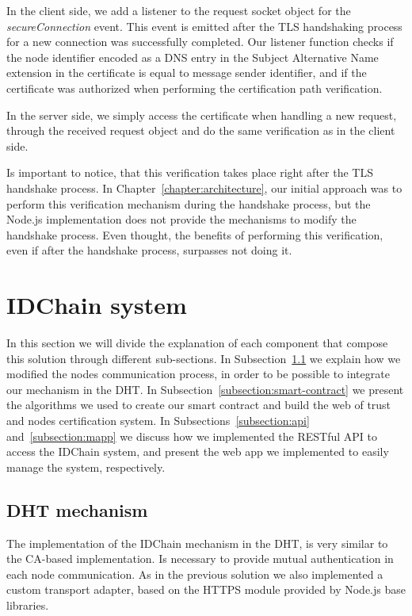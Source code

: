 In the client side, we add a listener to the request socket object for the \textit{secureConnection} event.
This event is emitted after the TLS handshaking process for a new connection was successfully completed.
Our listener function checks if the node identifier encoded as a DNS entry in the Subject Alternative Name extension in the certificate is equal to message sender identifier, and if the certificate was authorized when performing the certification path verification.


In the server side, we simply access the certificate when handling a new request, through the received request object and do the same verification as in the client side.

Is important to notice, that this verification takes place right after the TLS handshake process.
In Chapter~\ref{chapter:architecture}, our initial approach was to perform this verification mechanism during the handshake process, but the Node.js implementation does not provide the mechanisms to modify the handshake process.
Even thought, the benefits of performing this verification, even if after the handshake process, surpasses not doing it.

\section{IDChain system}\label{implementation:idchain}

In this section we will divide the explanation of each component that compose this solution through different sub-sections.
In Subsection~\ref{subsection:dht-mechanism} we explain how we modified the nodes communication process, in order to be possible to integrate our mechanism in the DHT.
In Subsection~\ref{subsection:smart-contract} we present the algorithms we used to create our smart contract and build the web of trust and nodes certification system.
In Subsections~\ref{subsection:api} and~\ref{subsection:mapp} we discuss how we implemented the RESTful API to access the IDChain system, and present the web app we implemented to easily manage the system, respectively.

\subsection{DHT mechanism}\label{subsection:dht-mechanism}

The implementation of the IDChain mechanism in the DHT, is very similar to the CA-based implementation.
Is necessary to provide mutual authentication in each node communication.
As in the previous solution we also implemented a custom transport adapter, based on the HTTPS module provided by Node.js base libraries.

